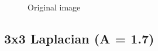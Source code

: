 \begin{figure}[!htb]
\begin{minipage}{0.40\textwidth}
        \caption{Original image}
        \end{minipage}
    \end{figure}


    \pagebreak
    \subsection{3x3 Laplacian (A = 1.7)}

